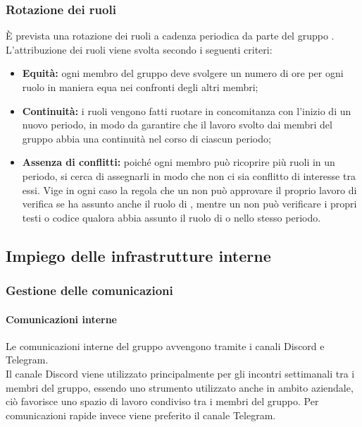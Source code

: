   
      \subsubsection{Rotazione dei ruoli}
      È prevista una rotazione dei ruoli a cadenza periodica da parte del gruppo \groupName{}.\\
      L'attribuzione dei ruoli viene svolta secondo i seguenti criteri:
      \begin{itemize}
        \item \textbf{Equità:} ogni membro del gruppo deve svolgere un numero di ore per ogni ruolo in maniera equa nei confronti degli altri membri;
        \item \textbf{Continuità:} i ruoli vengono fatti ruotare in concomitanza con l'inizio di un nuovo periodo, in modo da garantire che il lavoro svolto dai membri del gruppo abbia una continuità nel corso di ciascun periodo;
        \item \textbf{Assenza di conflitti:} poiché ogni membro può ricoprire più ruoli in un periodo, si cerca di assegnarli in modo che non ci sia conflitto di interesse tra essi. Vige in ogni caso la regola che un \roleProjectManagerLow{} non può approvare il proprio lavoro di verifica se ha assunto anche il ruolo di \roleVerifierLow{}, mentre un \roleVerifierLow{} non può verificare i propri testi o codice qualora abbia assunto il ruolo di \roleAnalystLow{} o \roleProgrammerLow{} nello stesso periodo.
      \end{itemize}
\vspace{2cm}

  \subsection{Impiego delle infrastrutture interne} \label{subsection:infrastrutture_interne}

    \subsubsection{Gestione delle comunicazioni}
      \paragraph{Comunicazioni interne}
       Le comunicazioni interne del gruppo \groupName{} avvengono tramite i canali Discord\glo{} e Telegram\glo{}.\\
       Il canale Discord\glo{} viene utilizzato principalmente per gli incontri settimanali tra i membri del gruppo, essendo uno strumento utilizzato anche in ambito aziendale, ciò favorisce uno spazio di lavoro condiviso tra i membri del gruppo.
       Per comunicazioni rapide invece viene preferito il canale Telegram\glo{}.
      
